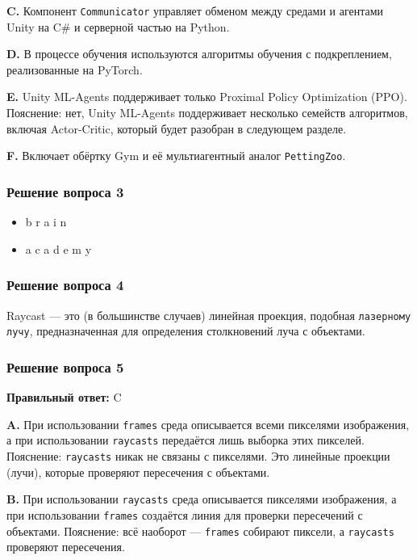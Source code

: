 \documentclass[11pt,a4paper]{article}
\begin{document}
\textbf{C.} Компонент \texttt{Communicator} управляет обменом между средами и агентами Unity на C\# и серверной частью на Python.

\textbf{D.} В процессе обучения используются алгоритмы обучения с подкреплением, реализованные на PyTorch.

\textbf{E.} Unity ML-Agents поддерживает только Proximal Policy Optimization (PPO). Пояснение: нет, Unity ML-Agents поддерживает несколько семейств алгоритмов, включая Actor-Critic, который будет разобран в следующем разделе.

\textbf{F.} Включает обёртку Gym и её мультиагентный аналог \texttt{PettingZoo}.

\subsubsection{Решение вопроса 3}\label{q3-solution}

\begin{itemize}
\tightlist
\item
  b r a i n
\item
  a c a d e m y
\end{itemize}

\subsubsection{Решение вопроса 4}\label{q4-solution}

Raycast --- это (в большинстве случаев) линейная проекция, подобная \texttt{лазерному лучу}, предназначенная для определения столкновений луча с объектами.

\subsubsection{Решение вопроса 5}\label{q5-solution}

\textbf{Правильный ответ:} C

\textbf{A.} При использовании \texttt{frames} среда описывается всеми пикселями изображения, а при использовании \texttt{raycasts} передаётся лишь выборка этих пикселей. Пояснение: \texttt{raycasts} никак не связаны с пикселями. Это линейные проекции (лучи), которые проверяют пересечения с объектами.

\textbf{B.} При использовании \texttt{raycasts} среда описывается пикселями изображения, а при использовании \texttt{frames} создаётся линия для проверки пересечений с объектами. Пояснение: всё наоборот --- \texttt{frames} собирают пиксели, а \texttt{raycasts} проверяют пересечения.
\end{document}
